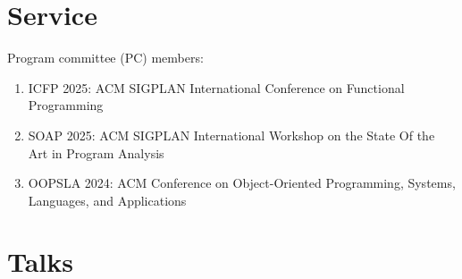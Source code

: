 \documentclass[letterpaper,11pt]{article}
\begin{document}


\section{Service}
Program committee (PC) members:
\begin{enumerate}
  \item{ICFP 2025: ACM SIGPLAN International Conference on Functional Programming}
  \item{SOAP 2025: ACM SIGPLAN International Workshop on the State Of the Art in Program Analysis}
  \item{OOPSLA 2024: ACM Conference on Object-Oriented Programming, Systems, Languages, and Applications}
\end{enumerate}


\section{Talks}
\end{document}
